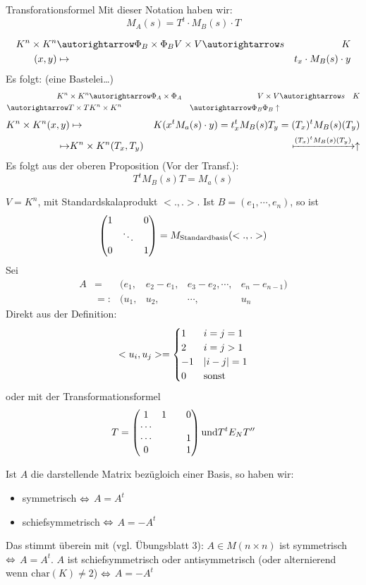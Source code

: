 \begin{Prop}{Transforationsformel}
  Mit dieser Notation haben wir:
  \[M_A(s)=T^t\cdot M_B(s)\cdot T\]
\end{Prop}
\begin{Bew}
  \begin{align*}
    K^n\times K^n &\ara{\Phi_B\times\Phi_B}{} V\times V\ara{s}{}&K\\
    (x,y)&\mapsto&t_x\cdot M_B(s)\cdot y
  \end{align*}
  Es folgt: (eine Bastelei\ldots)
  \begin{align*}
    K^n\times K^n&\ara{\Phi_A\times\Phi_A}{}&V\times V&\ara{s}{}&K\\
    \ara{T\times T}{}&K^n\times K^n&\ara{\Phi_B\Phi_B}{}\uparrow&&
  \end{align*}
  \begin{align*}
    K^n\times K^n (x,y)&\mapsto& K(x^tM_a(s)\cdot y)=t_x^tM_B(s)T_y = (T_x)^tM_B(s)(T_y)\\
    \mapsto&K^n\times K^n(T_x,T_y)&\xmapsto{(T_x)^tM_B(s)(T_y)}\uparrow
  \end{align*}
  Es folgt aus der oberen Proposition (Vor der Transf.):
  \[T^tM_B(s)T=M_a(s)\]
\end{Bew}
\begin{Bsp}
  $V=K^n$, mit Standardskalaprodukt $<.,.>$. Ist $B=(e_1,\cdots,e_n)$, so ist
  \[\begin{pmatrix}1&&0\\&\ddots&\\0&&1\end{pmatrix}=M_{\text{Standardbasis}}(<.,.>)\]
  Sei
  \begin{align*}
    A&=& (e_1,&e_2-e_1,&e_3-e_2,\cdots,&e_n-e_{n-1})\\
    &=:& (u_1,&u_2,&\cdots,&u_n
  \end{align*}
  Direkt aus der Definition:
  \[<u_i,u_j>=\begin{cases} 1& i=j=1 \\ 2&i=j>1\\ -1& \left| i-j \right|=1 \\ 0&\text{sonst}\end{cases} \]
  oder mit der Transformationsformel
  \[T=\begin{pmatrix}1&1&&0\\\cdots\\\cdots&&&1\\0&&&1\end{pmatrix} \text{und} T^tE_N T''\]
\end{Bsp}
\begin{Bem}
  Ist $A$ die darstellende Matrix bezügloich einer Basis, so haben wir:
  \begin{itemize}
    \item symmetrisch $\Leftrightarrow$ $A=A^t$
    \item schiefsymmetrisch $\Leftrightarrow$ $A=-A^t$
  \end{itemize}
  Das stimmt überein mit (vgl. Übungsblatt 3): $A\in M(n\times n)$ ist symmetrisch $\Leftrightarrow$ $A=A^t$. $A$ ist schiefsymmetrisch oder antisymmetrisch (oder alternierend wenn $\text{char}(K)\neq 2$) $\Leftrightarrow$ $A=-A^t$
\end{Bem}
